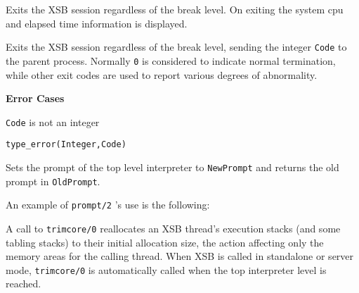 \begin{description}

%
    Exits the XSB session regardless of the break level.  On exiting
    the system cpu and elapsed time information is displayed.

%
Exits the XSB session regardless of the break level, sending the
integer {\tt Code} to the parent process.  Normally {\tt 0} is
considered to indicate normal termination, while other exit codes are
used to report various degrees of abnormality.

{\bf Error Cases}
\bi
\item 	{\tt Code} is not an integer
\bi
\item 	{\tt type\_error(Integer,Code)}
\ei
\ei

    Sets the prompt of the top level interpreter to {\tt NewPrompt} and 
    returns the old prompt in {\tt OldPrompt}.

    An example of {\tt prompt/2} 's use is the following:


%
A call to {\tt trimcore/0} reallocates an XSB thread's execution
stacks (and some tabling stacks) to their initial allocation size, the
action affecting only the memory areas for the calling thread.  When
XSB is called in standalone or server mode, {\tt trimcore/0} is
automatically called when the top interpreter level is reached.


\end{description}
